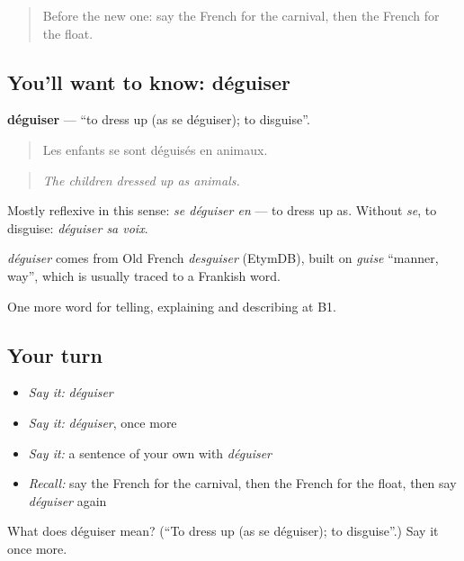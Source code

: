 \label{lesson:FR-C317-deguiser}



\begin{quote}
Before the new one: say the French for the carnival, then the French for the float.
\end{quote}

\subsection*{You'll want to know: déguiser}
\textbf{déguiser} — \textquotedblleft{}to dress up (as se déguiser); to disguise\textquotedblright{}.

\begin{quote}
Les enfants se sont déguisés en animaux.
\end{quote}

\begin{quote}
\emph{The children dressed up as animals.}
\end{quote}

Mostly reflexive in this sense: \emph{se déguiser en} — to dress up as. Without \emph{se}, to disguise: \emph{déguiser sa voix}.

\begin{cousinweb}
\emph{déguiser} comes from Old French \emph{desguiser} (EtymDB), built on \emph{guise} \textquotedblleft{}manner, way\textquotedblright{}, which is usually traced to a Frankish word.
\end{cousinweb}

\begin{grammarlens}[title={What you've built}]
One more word for telling, explaining and describing at B1.
\end{grammarlens}

\subsection*{Your turn}
\begin{itemize}
\raggedright
  \item \emph{Say it:} \emph{déguiser}
  \item \emph{Say it:} \emph{déguiser}, once more
  \item \emph{Say it:} a sentence of your own with \emph{déguiser}
  \item \emph{Recall:} say the French for the carnival, then the French for the float, then say \emph{déguiser} again
\end{itemize}

\begin{tcolorbox}[breakable,colback=teal!4,colframe=teal!35!black,title={Before you move on}]
What does déguiser mean? (\textquotedblleft{}To dress up (as se déguiser); to disguise\textquotedblright{}.) Say it once more.
\end{tcolorbox}
